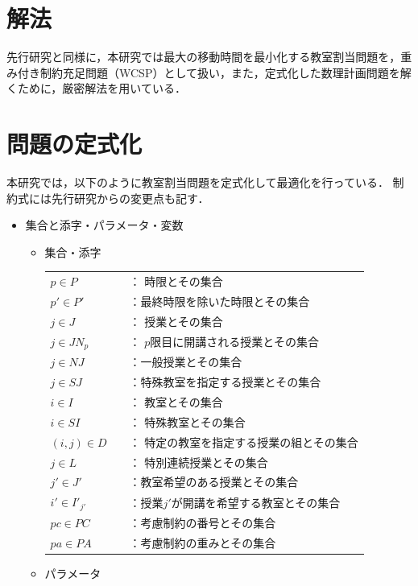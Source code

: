 \documentclass[12pt, a4paper, fleqn]{jreport}
\begin{document}
\section{解法}
先行研究と同様に，本研究では最大の移動時間を最小化する教室割当問題を，重み付き制約充足問題（WCSP）として扱い，また，定式化した数理計画問題を解くために，厳密解法を用いている．
\fi

\section{問題の定式化}

本研究では，以下のように教室割当問題を定式化して最適化を行っている．
制約式には先行研究からの変更点も記す．

\begin{itemize}
\item 集合と添字・パラメータ・変数
\begin{itemize}
\item 集合・添字\\

\vspace{-3.0mm}
\begin{tabular}{ll}
$p \in P$       & ： 時限とその集合  \\
$p' \in P'$   & ：最終時限を除いた時限とその集合  \\
$j \in J$       & ： 授業とその集合  \\
$j \in JN_{p}$　 &： $p$限目に開講される授業とその集合  \\
$j \in NJ$　   &：一般授業とその集合  \\
$j \in SJ$     &：特殊教室を指定する授業とその集合  \\
$i \in I$        &： 教室とその集合  \\
$i \in SI$　　  &： 特殊教室とその集合  \\
$(i,j) \in D$　  &： 特定の教室を指定する授業の組とその集合  \\
$j \in L$　　　  &： 特別連続授業とその集合  \\
$j' \in J'$　&：教室希望のある授業とその集合  \\
$i'\in I'_{j'}$　&：授業$j'$が開講を希望する教室とその集合  \\
$pc \in PC$　　  &：考慮制約の番号とその集合  \\
$pa \in PA$  　　&：考慮制約の重みとその集合  \\
\end{tabular}
\vspace{5.0mm}
\item パラメータ\\
\vspace{-7.0mm}
\[
\begin{array}{rcl}


\end{array}\]
\end{itemize}
\end{itemize}
\end{document}
